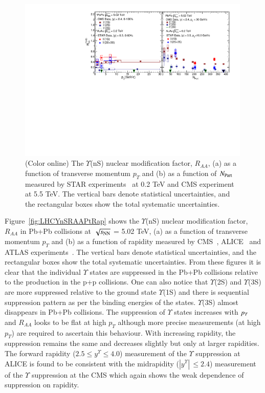 \begin{figure}
  \includegraphics[width=0.99\textwidth]{Figures/Fig8_RHIC_LHC_YnSRAA.pdf}
  \caption{(Color online) The $\Upsilon$(nS) nuclear modification factor, $R_{AA}$, (a) as a function of transverse momentum $p_{T}$
    and (b) as a function of $N_{\rm Part}$ measured by STAR experiments~\cite{Wang:2019vau} at 0.2 TeV and CMS experiment~\cite{CMS:2018zza} at 5.5 TeV.
    The vertical bars denote statistical uncertainties, and the rectangular boxes show the total systematic uncertainties.
  }
  \label{fig:RHICYnSRAANPart}
\end{figure}


Figure~\ref{fig:LHCYnSRAAPtRap} shows the $\Upsilon$(nS) nuclear modification factor, $R_{AA}$
in Pb+Pb collisions at $\sqrt{s_{\rm NN}}$ = 5.02 TeV, (a) as a function of transverse momentum $p_{T}$
and (b) as a function of rapidity measured by CMS~\cite{CMS:2018zza}, ALICE~\cite{ALICE:2020wwx}
and ATLAS experiments~\cite{ALICE:2020wwx}.
 The vertical bars denote statistical uncertainties, and the rectangular boxes
show the total systematic uncertainties. From these figures it is clear 
that the individual $\Upsilon$ states are suppressed in
the Pb+Pb collisions relative to the production in the p+p collisions.
One can also notice that $\Upsilon$(2S) and $\Upsilon$(3S) are 
more suppressed relative to the ground state $\Upsilon$(1S) and there is sequential
suppression pattern as per the binding energies of the states.
$\Upsilon$(3S) almost disappears in Pb+Pb collisions. 
The suppression of $\Upsilon$ states increases with $p_{T}$ and $R_{AA}$ looks
to be flat at high $p_T$
although more precise measurements (at high $p_T$) are required to ascertain
this behaviour. 
With increasing rapidity, the suppression remains the same and decreases
slightly but only at larger rapidities.
The forward rapidity ($2.5 \leq y^{\Upsilon} \leq 4.0$) measurement of the $\Upsilon$ suppression at 
ALICE is found to be consistent with the midrapidity ($|y^{\Upsilon}|\,\leq 2.4$)
measurement of the $\Upsilon$ suppression at the CMS which again shows the weak dependence
of suppression on rapidity.



